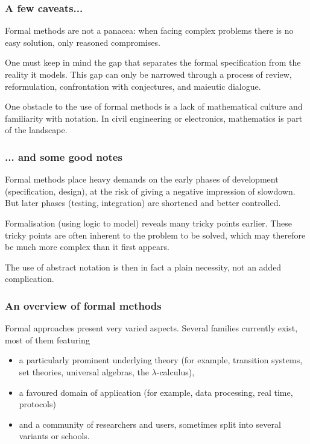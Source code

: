 \documentclass[compress,dvipdfmx]{beamer}
\begin{document}
%
\begin{frame}
  \frametitle{A few caveats...}

  Formal methods are not a panacea: when facing complex problems there
  is no easy solution, only reasoned compromises.

  \bigskip

  One must keep in mind the gap that separates the formal
  specification from the reality it models. This gap can only be
  narrowed through a process of review, reformulation, confrontation
  with conjectures, and maieutic dialogue.

  \bigskip

  One obstacle to the use of formal methods is a lack of mathematical
  culture and familiarity with notation. In civil engineering or
  electronics, mathematics is part of the landscape.

\end{frame}

%
\begin{frame}
  \frametitle{... and some good notes}

  Formal methods place heavy demands on the early phases of
  development (specification, design), at the risk of giving a
  negative impression of slowdown. But later phases (testing,
  integration) are shortened and better controlled.

  \bigskip

  Formalisation (using logic to model) reveals many tricky points
  earlier. These tricky points are often inherent to the problem to be
  solved, which may therefore be much more complex than it first
  appears.

  \bigskip

  The use of abstract notation is then in fact a plain necessity, not
  an added complication.

\end{frame}

%
\begin{frame}
\frametitle{An overview of formal methods}

Formal approaches present very varied aspects. Several families
currently exist, most of them featuring

\begin{itemize}

  \item a particularly prominent underlying theory (for example,
  transition systems, set theories, universal algebras, the
  $\lambda$-calculus),

  \item a favoured domain of application (for example, data
  processing, real time, protocols)

  \item and a community of researchers and users, sometimes split
  into several variants or schools.

\end{itemize}

\end{frame}
\end{document}

